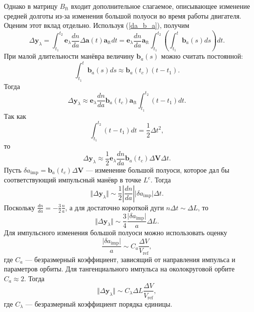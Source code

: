 Однако в матрицу $B_{\text{ft}}$ входит дополнительное слагаемое, описывающее изменение средней долготы из-за изменения большой полуоси во время работы двигателя. Оценим этот вклад отдельно. Используя (\ref{da_b_a}), получим
\begin{equation}
    \Delta \mathbf{y}_{\lambda} = \int_{t_1}^{t_2} \mathbf{e}_\lambda \frac{dn}{da} \Delta \mathbf{a}(t) \mathbf{a}_{\text{ft}} dt = 
    \mathbf{e}_\lambda \frac{dn}{da} \mathbf{a}_{\text{ft}} \int_{t_1}^{t_2} \left( \int_{t_1}^t \mathbf{b}_a(s) ds \right) dt.
\end{equation}
При малой длительности манёвра величину $\mathbf{b}_a(s)$ можно считать постоянной: 
\begin{equation}
    \int_{t_1}^t \mathbf{b}_a(s) ds \approx \mathbf{b}_a(t_c) (t - t_1).
\end{equation}
Тогда
\begin{equation}
    \Delta \mathbf{y}_{\lambda} \approx
    \mathbf{e}_\lambda \frac{dn}{da} \mathbf{b}_a(t_c) \mathbf{a}_{\text{ft}} \int_{t_1}^{t_2} (t - t_1) dt.
\end{equation}
Так как
\begin{equation}
    \int_{t_1}^{t_2} (t - t_1) dt = \frac{1}{2} \Delta t^2, 
\end{equation}
то
\begin{equation}
    \Delta \mathbf{y}_{\lambda} \approx
    \frac{1}{2} \mathbf{e}_\lambda \frac{dn}{da} \mathbf{b}_a(t_c) \Delta \mathbf{V}\Delta t.
\end{equation}
Пусть $\delta a_{\text{imp}} = \mathbf{b}_a(t_c) \Delta \mathbf{V}$ --- изменение большой полуоси, которое дал бы соответствующий импульсный манёвр в точке $L^\text{c}$. Тогда
\begin{equation}
    \Vert \Delta \mathbf{y}_{\lambda} \Vert \sim \frac{1}{2} \left\vert \frac{dn}{da} \right\vert \vert \delta a_{\text{imp}} \vert \Delta t.
\end{equation}
Поскольку $\frac{dn}{da} = -\frac{3}{2} \frac{n}{a}$, а для достаточно короткой дуги $n \Delta t \sim \Delta L$, то 
\begin{equation}
    \Vert \Delta \mathbf{y}_{\lambda} \Vert \sim \frac{3}{4} \frac{\vert \delta a_{\text{imp}} \vert}{a} \Delta L.
\end{equation}
Для импульсного изменения большой полуоси можно использовать оценку
\begin{equation}
    \frac{\vert \delta a_{\text{imp}} \vert}{a} \sim
    C_a \frac{\Delta V}{V_\text{ref}},
\end{equation}
где $C_a$ --- безразмерный коэффициент, зависящий от направления импульса и параметров орбиты. Для тангенциального импульса на околокруговой орбите $C_a \approx 2$. Тогда
\begin{equation}
    \Vert \Delta \mathbf{y}_{\lambda} \Vert \sim C_\lambda \Delta L \frac{\Delta V}{V_\text{ref}},
\end{equation}
где $C_\lambda$ --- безразмерный коэффициент порядка единицы. 

